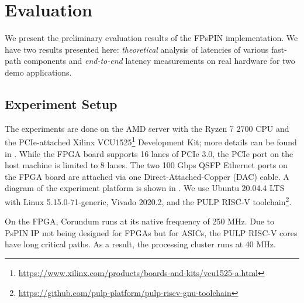 \chapter{Evaluation} \label{chap:eval}


We present the preliminary evaluation results of the FPsPIN implementation.  We have two results presented here: \emph{theoretical} analysis of latencies of various fast-path components and \emph{end-to-end} latency measurements on real hardware for two demo applications.

\section{Experiment Setup} \label{sec:eval-setup}

The experiments are done on the AMD server with the Ryzen 7 2700 CPU and the PCIe-attached Xilinx VCU1525\footnote{\url{https://www.xilinx.com/products/boards-and-kits/vcu1525-a.html}} Development Kit; more details can be found in .  While the FPGA board supports 16 lanes of PCIe 3.0, the PCIe port on the host machine is limited to 8 lanes.  The two 100 Gbps QSFP Ethernet ports on the FPGA board are attached via one Direct-Attached-Copper (DAC) cable.  A diagram of the experiment platform is shown in .  We use Ubuntu 20.04.4 LTS with Linux 5.15.0-71-generic, Vivado 2020.2, and the PULP RISC-V toolchain\footnote{\url{https://github.com/pulp-platform/pulp-riscv-gnu-toolchain}}. 

On the FPGA, Corundum runs at its native frequency of 250 MHz.  Due to PsPIN IP not being designed for FPGAs but for ASICs, the PULP RISC-V cores have long critical paths.  As a result, the processing cluster runs at 40 MHz.


